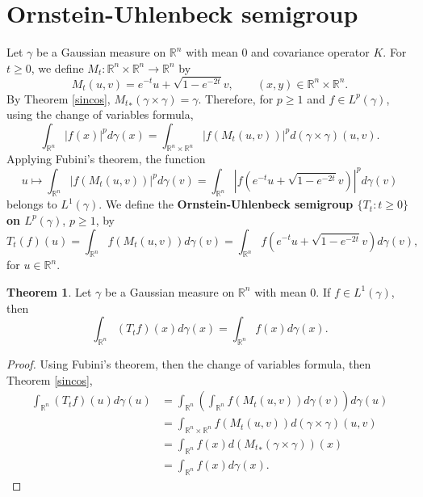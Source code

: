 \documentclass{article}
\theoremstyle{definition}
\newtheorem{theorem}{Theorem}
\theoremstyle{definition}
\begin{document}
\section{Ornstein-Uhlenbeck semigroup}
Let $\gamma$ be a Gaussian measure on $\mathbb{R}^n$ with mean $0$ and covariance operator
$K$. 
For $t \geq 0$, we define $M_t:\mathbb{R}^n \times \mathbb{R}^n \to \mathbb{R}^n$ by
\[
M_t(u,v) = e^{-t} u + \sqrt{1-e^{-2t}}v, \qquad (x,y) \in \mathbb{R}^n \times \mathbb{R}^n.
\]
By Theorem \ref{sincos}, ${M_t}_*(\gamma \times \gamma)=\gamma$. 
Therefore, for $p \geq 1$ and $f \in L^p(\gamma)$, using the change of variables formula,
\[
\int_{\mathbb{R}^n} |f(x)|^p d\gamma(x)=\int_{\mathbb{R}^n \times \mathbb{R}^n}
|f(M_t(u,v))|^p d(\gamma \times \gamma)(u,v).
\]
Applying Fubini's theorem, the function
\[
u \mapsto \int_{\mathbb{R}^n} |f(M_t(u,v))|^p d\gamma(v)
=\int_{\mathbb{R}^n} |f(e^{-t} u + \sqrt{1-e^{-2t}}v)|^p d\gamma(v)
\]
belongs to $L^1(\gamma)$. 
We define the \textbf{Ornstein-Uhlenbeck semigroup $\{T_t: t \geq 0\}$
on $L^p(\gamma)$}, $p \geq 1$, by
\[
T_t(f)(u) =
\int_{\mathbb{R}^n} f(M_t(u,v)) d\gamma(v)
= \int_{\mathbb{R}^n} f\left(e^{-t}u+\sqrt{1-e^{-2t}}v\right) d\gamma(v),
\]
for $u \in \mathbb{R}^n$. 


\begin{theorem}
Let $\gamma$ be a Gaussian measure on
$\mathbb{R}^n$ with mean $0$.
If $f \in L^1(\gamma)$, then
\[
\int_{\mathbb{R}^n} (T_t f)(x) d\gamma(x)
=\int_{\mathbb{R}^n} f(x) d\gamma(x).
\]
\label{invariant}
\end{theorem}
\begin{proof}
Using Fubini's theorem, then
the change of variables formula, then  Theorem \ref{sincos}, 
\begin{align*}
\int_{\mathbb{R}^n} (T_t f)(u) d\gamma(u) &=
\int_{\mathbb{R}^n} \left(\int_{\mathbb{R}^n} f(M_t(u,v)) d\gamma(v)\right)
d\gamma(u)\\
&=\int_{\mathbb{R}^n \times\mathbb{R}^n} f(M_t(u,v)) d(\gamma \times \gamma)(u,v)\\
&=\int_{\mathbb{R}^n} f(x) d({M_t}_*(\gamma \times \gamma))(x)\\
&=\int_{\mathbb{R}^n} f(x) d\gamma(x).
\end{align*}
\end{proof}
\end{document}
